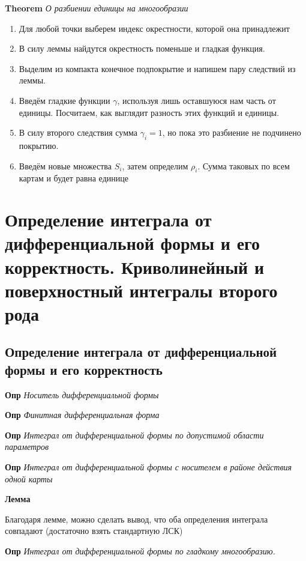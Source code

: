 \documentclass[a4paper, 14pt]{article}
\begin{document}
    \textbf{Theorem} \textit{О разбиении единицы на многообразии}
    
    \begin{enumerate}
        \item Для любой точки выберем индекс окрестности, которой она принадлежит
        \item В силу леммы найдутся окрестность поменьше и гладкая функция.
        \item Выделим из компакта конечное подпокрытие и напишем пару следствий из леммы.
        \item Введём гладкие функции $\gamma$, используя лишь оставшуюся нам часть от единицы.
        Посчитаем, как выглядит разность этих функций и единицы.
        \item В силу второго следствия сумма $\gamma_i = 1$, но пока это разбиение не подчинено покрытию.
        \item Введём новые множества $S_i$, затем определим $\rho_i$.
        Сумма таковых по всем картам и будет равна единице
    \end{enumerate}
    
    \section{Определение интеграла от дифференциальной формы и его корректность.
    Криволинейный и поверхностный интегралы второго рода}
    
    \subsection{Определение интеграла от дифференциальной формы и его корректность}
    
    \textbf{Опр} \textit{Носитель дифференциальной формы}
    
    \textbf{Опр} \textit{Финитная дифференциальная форма}
    
    \textbf{Опр} \textit{Интеграл от дифференциальной формы по допустимой области параметров}
    
    \textbf{Опр} \textit{Интеграл от дифференциальной формы с носителем в районе действия одной карты}
    
    \textbf{Лемма}
    
    Благодаря лемме, можно сделать вывод, что оба определения интеграла совпадают (достаточно взять стандартную ЛСК)
    
    \textbf{Опр} \textit{Интеграл от дифференциальной формы по гладкому многообразию.}
    
\end{document}
